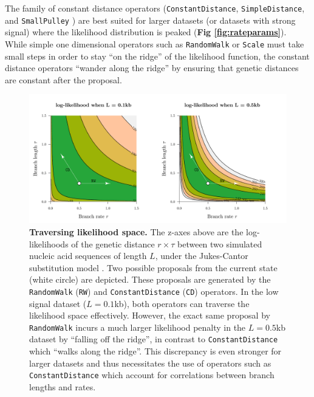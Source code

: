 \documentclass[10pt,letterpaper]{article}
\begin{document}
The family of constant distance operators (\texttt{ConstantDistance}, \texttt{SimpleDistance}, and \texttt{SmallPulley} \cite{zhang2020improving}) are best suited for larger datasets (or datasets with strong signal) where the likelihood distribution is peaked (\textbf{Fig \ref{fig:rateparams}}).
While simple one dimensional operators such as \texttt{RandomWalk} or \texttt{Scale} must take small steps in order to stay ``on the ridge'' of the likelihood function, the constant distance operators ``wander along the ridge''  by ensuring that genetic distances are constant after the proposal.



\begin{figure}[!h]
\includegraphics[width=\textwidth]{Figures/correlations.pdf}
\caption{\textbf{Traversing likelihood space.}
The z-axes above are the log-likelihoods of the genetic distance $r \times \tau$ between two simulated nucleic acid sequences of length $L$, under the Jukes-Cantor substitution model \cite{jukes1969evolution}. 
Two possible proposals from the current state (white circle) are depicted.
These proposals are generated by the \texttt{RandomWalk} (\texttt{RW}) and \texttt{ConstantDistance} (\texttt{CD}) operators.
In the low signal dataset ($L=0.1$kb), both operators can traverse the likelihood space effectively.
 However, the exact same proposal by \texttt{RandomWalk} incurs a much larger likelihood penalty in the $L=0.5$kb dataset by ``falling off the ridge'', in contrast to \texttt{ConstantDistance} which ``walks along the ridge''.
 This discrepancy is even stronger for larger datasets and thus necessitates the use of operators such as \texttt{ConstantDistance} which account for correlations between branch lengths and rates. }
\label{fig:landscape}
\end{figure}
\end{document}

